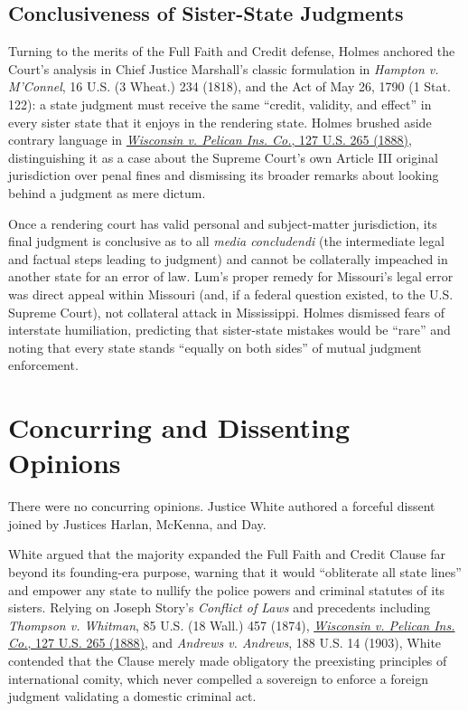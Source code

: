 \documentclass[12pt]{article}
\begin{document}
\subsection{Conclusiveness of Sister-State Judgments}
Turning to the merits of the Full Faith and Credit defense, Holmes anchored the Court's analysis in Chief Justice Marshall's classic formulation in \textit{Hampton v. M'Connel}, 16 U.S. (3 Wheat.) 234 (1818), and the Act of May 26, 1790 (1 Stat. 122): a state judgment must receive the same ``credit, validity, and effect'' in every sister state that it enjoys in the rendering state. Holmes brushed aside contrary language in \href{https://supreme.justia.com/cases/federal/us/127/265/}{\textit{Wisconsin v. Pelican Ins. Co.}, 127 U.S. 265 (1888)}, distinguishing it as a case about the Supreme Court's own Article III original jurisdiction over penal fines and dismissing its broader remarks about looking behind a judgment as mere dictum.

Once a rendering court has valid personal and subject-matter jurisdiction, its final judgment is conclusive as to all \textit{media concludendi} (the intermediate legal and factual steps leading to judgment) and cannot be collaterally impeached in another state for an error of law. Lum's proper remedy for Missouri's legal error was direct appeal within Missouri (and, if a federal question existed, to the U.S. Supreme Court), not collateral attack in Mississippi. Holmes dismissed fears of interstate humiliation, predicting that sister-state mistakes would be ``rare'' and noting that every state stands ``equally on both sides'' of mutual judgment enforcement.

\section{Concurring and Dissenting Opinions}

There were no concurring opinions. Justice White authored a forceful dissent joined by Justices Harlan, McKenna, and Day.

White argued that the majority expanded the Full Faith and Credit Clause far beyond its founding-era purpose, warning that it would ``obliterate all state lines'' and empower any state to nullify the police powers and criminal statutes of its sisters. Relying on Joseph Story's \textit{Conflict of Laws} and precedents including \textit{Thompson v. Whitman}, 85 U.S. (18 Wall.) 457 (1874), \href{https://supreme.justia.com/cases/federal/us/127/265/}{\textit{Wisconsin v. Pelican Ins. Co.}, 127 U.S. 265 (1888)}, and \textit{Andrews v. Andrews}, 188 U.S. 14 (1903), White contended that the Clause merely made obligatory the preexisting principles of international comity, which never compelled a sovereign to enforce a foreign judgment validating a domestic criminal act.
\end{document}
